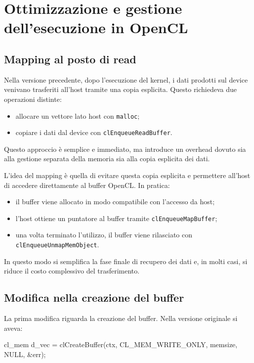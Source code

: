 \chapter{Ottimizzazione e gestione dell’esecuzione in OpenCL}\label{sec:opencl_basi_mapping}

\section{Mapping al posto di read}
Nella versione precedente, dopo l’esecuzione del kernel, i dati prodotti sul device venivano trasferiti all’host tramite una copia esplicita. Questo richiedeva due operazioni distinte:
\begin{itemize}
    \item allocare un vettore lato host con \texttt{malloc};
    \item copiare i dati dal device con \texttt{clEnqueueReadBuffer}.
\end{itemize}
\noindent
Questo approccio è semplice e immediato, ma introduce un overhead dovuto sia alla gestione separata della memoria sia alla copia esplicita dei dati.

L’idea del mapping è quella di evitare questa copia esplicita e permettere all’host di accedere direttamente al buffer OpenCL. In pratica:
\begin{itemize}
    \item il buffer viene allocato in modo compatibile con l’accesso da host;
    \item l’host ottiene un puntatore al buffer tramite \texttt{clEnqueueMapBuffer};
    \item una volta terminato l’utilizzo, il buffer viene rilasciato con \texttt{clEnqueueUnmapMemObject}.
\end{itemize}

In questo modo si semplifica la fase finale di recupero dei dati e, in molti casi, si riduce il costo complessivo del trasferimento.

\section{Modifica nella creazione del buffer}

La prima modifica riguarda la creazione del buffer. Nella versione originale si aveva:

\begin{code}[caption={Creazione del buffer senza mapping}, label={code:buffer_no_map}]
cl_mem d_vec = clCreateBuffer(ctx, CL_MEM_WRITE_ONLY, memsize, NULL, &err);
\end{code}

